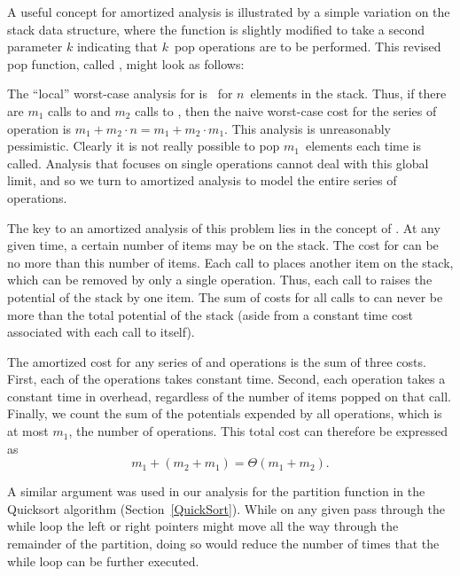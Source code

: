 A useful concept for amortized analysis is illustrated by a simple
variation on the stack data structure, where the  function
is slightly modified to take a second parameter $k$ indicating that
$k$~pop operations are to be performed.
This revised pop function, called
, might look as follows:


The ``local'' worst-case analysis for  is \Thetan\ for
$n$~elements in the stack.
Thus, if there are $m_1$ calls to  and $m_2$ calls to
, then the naive worst-case cost for the series of
operation is \mbox{\(m_1 + m_2\cdot n = m_1 + m_2 \cdot m_1\)}.
This analysis is unreasonably pessimistic.
Clearly it is not really possible to pop $m_1$~elements each time
 is called.
Analysis that focuses on single operations cannot deal with this
global limit, and so we turn to amortized analysis to model the
entire series of operations.

The key to an amortized analysis of this problem lies in the concept
of .
At any given time, a certain number of items may be on the stack.
The cost for  can be no more than this number of items.
Each call to  places another item on the stack, which can
be removed by only a single  operation.
Thus, each call to  raises the potential of the stack by
one item.
The sum of costs for all calls to  can never be more
than the total potential of the stack (aside from a constant time cost
associated with each call to  itself).

The amortized cost for any series of  and 
operations is the sum of three costs.
First, each of the  operations takes constant time.
Second, each  operation takes a constant time in
overhead, regardless of the number of items popped on that call.
Finally, we count the sum of the potentials expended by all
 operations, which is at most $m_1$, the number of
 operations.
This total cost can therefore be expressed as
\[m_1 + (m_2 + m_1) = \Theta(m_1 + m_2).\]

\vspace{-\bigskipamount}
A similar argument was used in our analysis for the partition function
in the Quicksort algorithm (Section~\ref{QuickSort}).
While on any given pass through the while loop the left or right
pointers might move all the way through the remainder of the
partition, doing so would reduce the number of times that the while
loop can be further executed.

